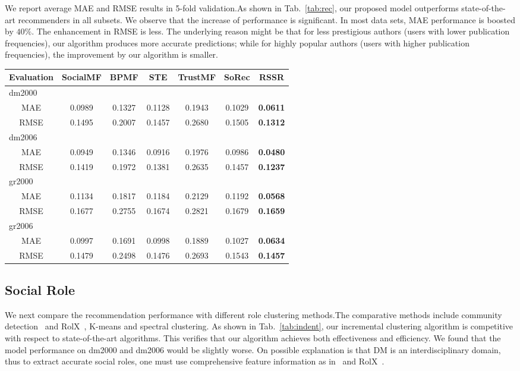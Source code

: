 \documentclass{ieeeaccess}
\begin{document}
We report average MAE and RMSE results in 5-fold validation.As shown in Tab.~\ref{tab:rec}, our proposed model outperforms state-of-the-art recommenders in all subsets. We observe that the increase of performance is significant. In most data sets, MAE performance is boosted by $40\%$. The enhancement in RMSE is less. The underlying reason might be that for less prestigious authors (users with lower publication frequencies), our algorithm produces more accurate predictions; while for highly popular authors (users with higher publication frequencies), the improvement by our algorithm is smaller.

\begin{table*}[htbp]
\caption{Comparative performance of recommendation}
\centering
\begin{tabular}{|c|c|c|c|c|c|c|}
\hline
Evaluation &SocialMF	&BPMF	&STE	&TrustMF  & SoRec &	RSSR\\\hline
\multicolumn{6}{|l|}{dm2000} \\\hline
MAE	 &0.0989&	0.1327&0.1128	&0.1943&0.1029&\textbf{0.0611}\\\hline
RMSE	&0.1495&	0.2007	&0.1457	&0.2680&	0.1505	&\textbf{0.1312}\\\hline
\multicolumn{6}{|l|}{dm2006} \\\hline				
MAE	 & 0.0949 &0.1346	&0.0916	&0.1976	&0.0986&\textbf{0.0480}\\\hline
RMSE &	0.1419	& 0.1972&	0.1381	& 0.2635& 0.1457& \textbf{0.1237}\\\hline
\multicolumn{6}{|l|}{gr2000}			\\\hline	
MAE	&0.1134&	0.1817&	0.1184&	0.2129&	0.1192&\textbf{0.0568}\\\hline
RMSE	&0.1677	&0.2755	&0.1674	&0.2821&	0.1679&\textbf{0.1659}\\\hline
\multicolumn{6}{|l|}{gr2006}			\\\hline
MAE	&0.0997	&0.1691&	0.0998&	0.1889&	0.1027&\textbf{0.0634}\\\hline
RMSE	&0.1479	&0.2498	&0.1476&	0.2693	&0.1543	&\textbf{0.1457}\\\hline
\end{tabular}\label{tab:rec}
\end{table*}

\subsection{Social Role}
We next compare the recommendation performance with different role clustering methods.The comparative methods include community detection~\cite{Mislove2010You} and RolX~\cite{Henderson2012Rolx}, K-means and spectral clustering. As shown in Tab.~\ref{tab:indent}, our incremental clustering algorithm is competitive with respect to state-of-the-art algorithms. This verifies that our algorithm achieves both effectiveness and efficiency. We found that the model performance on dm2000 and dm2006 would be slightly worse. On possible explanation is that DM is an interdisciplinary domain, thus to extract accurate social roles, one must use comprehensive feature information as in~\cite{Mislove2010You} and RolX~\cite{Henderson2012Rolx}.
\end{document}
